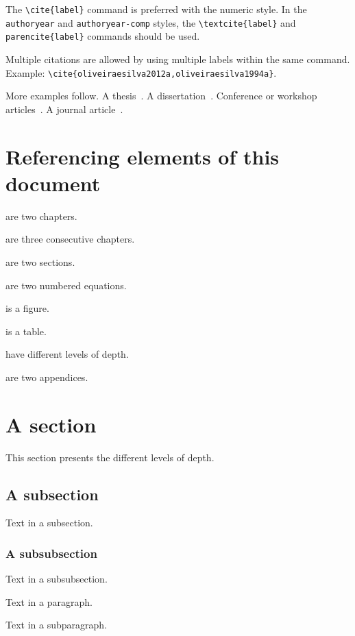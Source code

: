 The \verb+\cite{label}+ command is preferred with the numeric style.
In the \texttt{authoryear} and \texttt{authoryear-comp} styles, the \verb+\textcite{label}+ and \verb+parencite{label}+ commands should be used.

Multiple citations are allowed by using multiple labels within the same command.
Example: \verb+\cite{oliveiraesilva2012a,oliveiraesilva1994a}+.

More examples follow.
A  thesis~\parencite{oliveiraesilva1994a}.
A  dissertation~\parencite{antunes2015a}.
Conference or workshop articles~\parencite{antunes2019a,antunes2020a}.
A journal article~\parencite{antunes2019b}.


\section{Referencing elements of this document}
\label{c3:s:referencing-elements-of-this-document}

 are two chapters.

 are three consecutive chapters.

 are two sections.

 are two numbered equations.

 is a figure.

 is a table.

 have different levels of depth.

 are two appendices.


\section{A section}
\label{c3:s:a-section}

This section presents the different levels of depth.


\subsection{A subsection}
\label{c3:ss:a-subsection}

Text in a subsection.


\subsubsection{A subsubsection}

Text in a subsubsection.



Text in a paragraph.



Text in a subparagraph.
